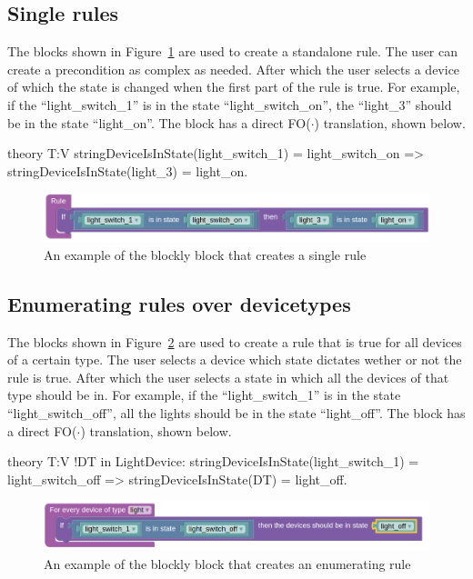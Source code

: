 \documentclass[11pt,a4paper]{report}
\newcommand{\fodot}{FO($\cdot$)\xspace}
\begin{document}
\subsection{Single rules}
The blocks shown in Figure~\ref{fig:homy_single_rule} are used to create a standalone rule. The user can create a precondition as complex as needed. After which the user selects a device of which the state is changed when the first part of the rule is true. For example, if the ``light\_switch\_1'' is in the state ``light\_switch\_on'', the ``light\_3'' should be in the state ``light\_on''. The block has a direct \fodot translation, shown below.

\begin{idplisting}
theory T:V {
    stringDeviceIsInState(light_switch_1) = light_switch_on => stringDeviceIsInState(light_3) = light_on.
}
\end{idplisting}

\begin{figure}
    \centering
    \includegraphics[width=0.8\linewidth]{images/homy_single_rule.png}
    \caption{An example of the blockly block that creates a single rule}
    \label{fig:homy_single_rule}
\end{figure}

\subsection{Enumerating rules over devicetypes}
The blocks shown in Figure~\ref{fig:homy_enumerate_rule_devicetype} are used to create a rule that is true for all devices of a certain type. The user selects a device which state dictates wether or not the rule is true. After which the user selects a state in which all the devices of that type should be in. For example, if the ``light\_switch\_1'' is in the state ``light\_switch\_off'', all the lights should be in the state ``light\_off''. The block has a direct \fodot translation, shown below.

\begin{idplisting}
theory T:V {
    !DT in LightDevice: stringDeviceIsInState(light_switch_1) = light_switch_off => stringDeviceIsInState(DT) = light_off.
}
\end{idplisting}

\begin{figure}
    \centering
    \includegraphics[width=0.8\linewidth]{images/homy_enumerate_rule_devicetype.png}
    \caption{An example of the blockly block that creates an enumerating rule}
    \label{fig:homy_enumerate_rule_devicetype}
\end{figure}
\end{document}
